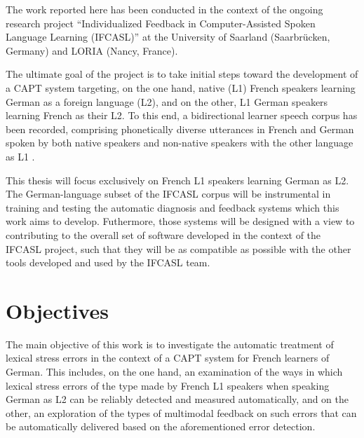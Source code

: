 The work reported here has been conducted in the context of the ongoing research project ``Individualized Feedback in Computer-Assisted Spoken Language Learning (IFCASL)'' at the University of Saarland (Saarbrücken, Germany) and LORIA (Nancy, France). 

The ultimate goal of the project is to take initial steps toward the development of a CAPT system targeting, on the one hand, native (L1) French speakers learning German as a foreign language (L2), and on the other, L1 German speakers learning French as their L2. To this end, a bidirectional learner speech corpus has been recorded, comprising phonetically diverse utterances in French and German spoken by both native speakers and non-native speakers with the other language as L1 \citep{Fauth2014,Trouvain2013}.  

This thesis will focus exclusively on French L1 speakers learning German as L2. The German-language subset of the IFCASL corpus will be instrumental in training and testing the automatic diagnosis and feedback systems which this work aims to develop. Futhermore, those systems will be designed with a view to contributing to the overall set of software developed in the context of the IFCASL project, such that they will be as compatible as possible with the other tools developed and used by the IFCASL team. %


\section{Objectives}
\label{sec:intro:objectives}


The main objective of this work is to investigate the automatic treatment of lexical stress errors in the context of a CAPT system for French learners of German. This includes, on the one hand, an examination of the ways in which lexical stress errors of the type made by French L1 speakers when speaking German as L2 can be reliably detected and measured %
automatically, and on the other, an exploration of the types of multimodal feedback on such errors that can be automatically delivered based on the aforementioned error detection. 

